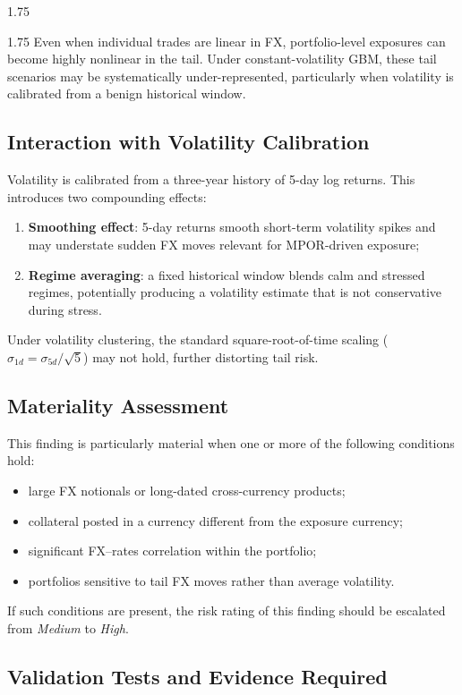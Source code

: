 \begin{spacing}{1.75}
\begin{spacing}{1.75}
		Even when individual trades are linear in FX, portfolio-level exposures can become highly nonlinear in the tail. Under constant-volatility GBM, these tail scenarios may be systematically under-represented, particularly when volatility is calibrated from a benign historical window.
		
		\subsection{Interaction with Volatility Calibration}
		
		Volatility is calibrated from a three-year history of 5-day log returns. This introduces two compounding effects:
		\begin{enumerate}
			\item \textbf{Smoothing effect}: 5-day returns smooth short-term volatility spikes and may understate sudden FX moves relevant for MPOR-driven exposure;
			\item \textbf{Regime averaging}: a fixed historical window blends calm and stressed regimes, potentially producing a volatility estimate that is not conservative during stress.
		\end{enumerate}
		
		Under volatility clustering, the standard square-root-of-time scaling ($\sigma_{1d}=\sigma_{5d}/\sqrt{5}$) may not hold, further distorting tail risk.
		
		\subsection{Materiality Assessment}
		This finding is particularly material when one or more of the following conditions hold:
		\begin{itemize}
			\item large FX notionals or long-dated cross-currency products;
			\item collateral posted in a currency different from the exposure currency;
			\item significant FX--rates correlation within the portfolio;
			\item portfolios sensitive to tail FX moves rather than average volatility.
		\end{itemize}
		
		If such conditions are present, the risk rating of this finding should be escalated from \textit{Medium} to \textit{High}.
		
		\subsection{Validation Tests and Evidence Required}
		

\end{spacing}
\end{spacing}
